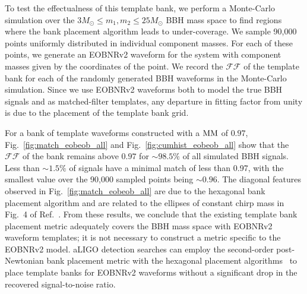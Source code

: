 To test the effectualness of this template bank, we perform a Monte-Carlo
simulation over the $3 M_\odot \le m_1, m_2 \le 25 M_\odot$ BBH mass space to
find regions where the bank placement algorithm leads to under-coverage.  We
sample 90,000 points uniformly distributed in individual component masses. For
each of these points, we generate an EOBNRv2 waveform for the system with
component masses given by the coordinates of the point.  We record the $\mathcal{FF}$ of the template
bank for each of the randomly generated BBH waveforms in the Monte-Carlo
simulation.  Since we use EOBNRv2 waveforms both to model the true BBH signals and
as matched-filter templates, any departure in fitting factor from unity is
due to the placement of the template bank grid. 

For a bank of template waveforms constructed with a $\mathrm{MM}$ of $0.97$,
Fig.~\ref{fig:match_eobeob_all} and Fig.~\ref{fig:cumhist_eobeob_all} show
that the $\mathcal{FF}$ of the bank remains above $0.97$ for $\sim 98.5\%$ of
all simulated BBH signals. Less than $\sim 1.5\%$ of signals have a minimal
match of less than 0.97, with the smallest value over the 90,000 sampled
points being $\sim 0.96$.  The diagonal features observed in
Fig.~\ref{fig:match_eobeob_all} are due to the hexagonal bank placement
algorithm and are related to the ellipses of constant chirp mass in Fig.~4  of
Ref.~\cite{BabaketalBankPlacement}.  From these results, we conclude that the
existing template bank placement metric adequately covers the BBH mass space
with EOBNRv2 waveform templates; it is not necessary to construct a metric
specific to the EOBNRv2 model. aLIGO detection searches can employ the
second-order post-Newtonian bank placement metric with the hexagonal placement 
algorithms~\cite{SathyaMetric2PN,SathyaBankPlacementTauN,BabaketalBankPlacement,OwenTemplateSpacing,Cokelaer:2007kx}
to place template banks for EOBNRv2
waveforms without a significant drop in the recovered signal-to-noise ratio.


